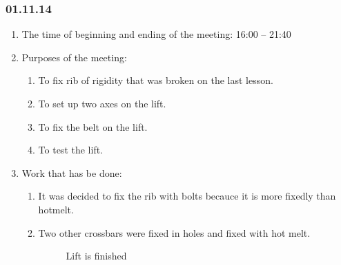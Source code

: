 
\subsubsection{01.11.14}

\begin{enumerate}
	\item The time of beginning and ending of the meeting:
	16:00 – 21:40
	\item Purposes of the meeting:
	\begin{enumerate}
	  \item To fix rib of rigidity that was broken on the last lesson.
	  
	  \item To set up two axes on the lift.
	  
	  \item To	fix the belt on the lift.
	  
	  \item To	test the lift.
	  
    \end{enumerate}
    
	\item Work that has be done:
	\begin{enumerate}
	  \item	It was decided to fix the rib with bolts becauce it is more fixedly than hotmelt.
      
      \item Two other crossbars were fixed in holes and fixed with hot melt.
      
      \begin{figure}[H]
      	\begin{minipage}[h]{1\linewidth}
      		\caption{Lift is finished}
      	\end{minipage}
      \end{figure}
      

\end{enumerate}
\end{enumerate}
